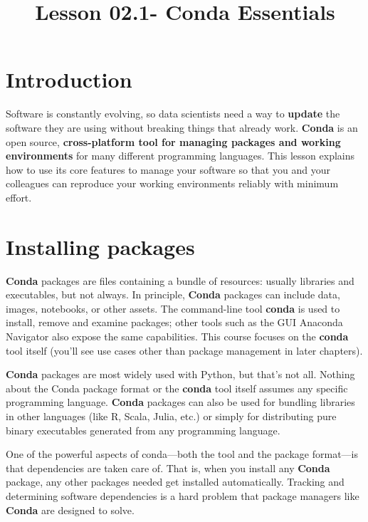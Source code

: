 \documentclass[11pt]{article}
\title{Lesson 02.1- Conda Essentials}
\begin{document}
    
    
    \maketitle
    
    

    
    \section{Introduction}\label{introduction}

Software is constantly evolving, so data scientists need a way to
\textbf{update} the software they are using without breaking things that
already work. \textbf{Conda} is an open source, \textbf{cross-platform
tool for managing packages and working environments} for many different
programming languages. This lesson explains how to use its core features
to manage your software so that you and your colleagues can reproduce
your working environments reliably with minimum effort.

    \section{Installing packages}\label{installing-packages}

\textbf{Conda} packages are files containing a bundle of resources:
usually libraries and executables, but not always. In principle,
\textbf{Conda} packages can include data, images, notebooks, or other
assets. The command-line tool \textbf{conda} is used to install, remove
and examine packages; other tools such as the GUI Anaconda Navigator
also expose the same capabilities. This course focuses on the
\textbf{conda} tool itself (you'll see use cases other than package
management in later chapters).

\textbf{Conda} packages are most widely used with Python, but that's not
all. Nothing about the Conda package format or the \textbf{conda} tool
itself assumes any specific programming language. \textbf{Conda}
packages can also be used for bundling libraries in other languages
(like R, Scala, Julia, etc.) or simply for distributing pure binary
executables generated from any programming language.

One of the powerful aspects of conda---both the tool and the package
format---is that dependencies are taken care of. That is, when you
install any \textbf{Conda} package, any other packages needed get
installed automatically. Tracking and determining software dependencies
is a hard problem that package managers like \textbf{Conda} are designed
to solve.
\end{document}
